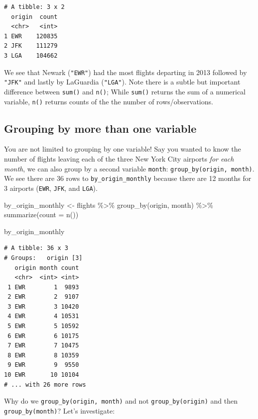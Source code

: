 \documentclass[
  letterpaper,
  DIV=11,
  numbers=noendperiod]{scrreprt}
\newenvironment{Shaded}{\begin{snugshade}}{\end{snugshade}}
\newcommand{\AttributeTok}[1]{\textcolor[rgb]{0.40,0.45,0.13}{#1}}
\newcommand{\FunctionTok}[1]{\textcolor[rgb]{0.28,0.35,0.67}{#1}}
\newcommand{\NormalTok}[1]{\textcolor[rgb]{0.00,0.23,0.31}{#1}}
\newcommand{\OtherTok}[1]{\textcolor[rgb]{0.00,0.23,0.31}{#1}}
\newcommand{\SpecialCharTok}[1]{\textcolor[rgb]{0.37,0.37,0.37}{#1}}
\theoremstyle{definition}
\theoremstyle{remark}
\begin{document}
\begin{verbatim}
# A tibble: 3 x 2
  origin  count
  <chr>   <int>
1 EWR    120835
2 JFK    111279
3 LGA    104662
\end{verbatim}

We see that Newark (\texttt{"EWR"}) had the most flights departing in
2013 followed by \texttt{"JFK"} and lastly by LaGuardia
(\texttt{"LGA"}). Note there is a subtle but important difference
between \texttt{sum()} and \texttt{n()}; While \texttt{sum()} returns
the sum of a numerical variable, \texttt{n()} returns counts of the the
number of rows/observations.

\hypertarget{grouping-by-more-than-one-variable}{%
\subsection{Grouping by more than one
variable}\label{grouping-by-more-than-one-variable}}

You are not limited to grouping by one variable! Say you wanted to know
the number of flights leaving each of the three New York City airports
\emph{for each month}, we can also group by a second variable
\texttt{month}: \texttt{group\_by(origin,\ month)}. We see there are 36
rows to \texttt{by\_origin\_monthly} because there are 12 months for 3
airports (\texttt{EWR}, \texttt{JFK}, and \texttt{LGA}).

\begin{Shaded}
\begin{Highlighting}[]
\NormalTok{by\_origin\_monthly }\OtherTok{\textless{}{-}}\NormalTok{ flights }\SpecialCharTok{\%\textgreater{}\%} 
  \FunctionTok{group\_by}\NormalTok{(origin, month) }\SpecialCharTok{\%\textgreater{}\%} 
  \FunctionTok{summarize}\NormalTok{(}\AttributeTok{count =} \FunctionTok{n}\NormalTok{())}

\NormalTok{by\_origin\_monthly}
\end{Highlighting}
\end{Shaded}

\begin{verbatim}
# A tibble: 36 x 3
# Groups:   origin [3]
   origin month count
   <chr>  <int> <int>
 1 EWR        1  9893
 2 EWR        2  9107
 3 EWR        3 10420
 4 EWR        4 10531
 5 EWR        5 10592
 6 EWR        6 10175
 7 EWR        7 10475
 8 EWR        8 10359
 9 EWR        9  9550
10 EWR       10 10104
# ... with 26 more rows
\end{verbatim}

Why do we \texttt{group\_by(origin,\ month)} and not
\texttt{group\_by(origin)} and then \texttt{group\_by(month)}? Let's
investigate:
\end{document}
